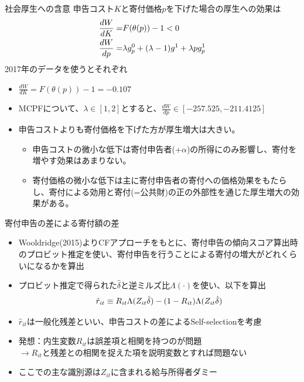 \documentclass[dvipdfmx,10pt]{beamer}
\begin{document}
\begin{frame}{社会厚生への含意}
	申告コスト$K$と寄付価格$p$を下げた場合の厚生への効果は
	\begin{align}
		\frac{dW}{dK}=&F(\theta(p))-1<0\notag\\
		\frac{dW}{dp}=&\lambda g_p^0+(\lambda-1)g^1+\lambda pg_p^1\notag
	\end{align}2017年のデータを使うとそれぞれ
	\begin{itemize}
		\item $\frac{dW}{dK}=F(\theta(p))-1=-0.107$
		\item MCPFについて、$\lambda\in[1,2]$とすると、$\frac{dW}{dp}\in[-257.525, -211.4125]$
		\item 申告コストよりも寄付価格を下げた方が厚生増大は大きい。
		\begin{itemize}
			\item 申告コストの微小な低下は寄付申告者(+$\alpha$)の所得にのみ影響し、寄付を増やす効果はあまりない。
			\item 寄付価格の微小な低下は主に寄付申告者の寄付への価格効果をもたらし、寄付による効用と寄付(=公共財)の正の外部性を通じた厚生増大の効果がある。
		\end{itemize}
	\end{itemize}
\end{frame}


\begin{frame}{寄付申告の差による寄付額の差}
	\begin{itemize}
		\item Wooldridge(2015)よりCFアプローチをもとに、寄付申告の傾向スコア算出時のプロビット推定を使い、寄付申告を行うことによる寄付の増大がどれくらいになるかを算出
		\item プロビット推定で得られた$\hat{\delta}$と逆ミルズ比$\Lambda(\cdot)$を使い、以下を算出
		\begin{align}
			\hat{r}_{it}\equiv R_{it}\Lambda(Z_{it}\hat{\delta})-(1-R_{it})\Lambda(Z_{it}\hat{\delta})\notag
		\end{align}
		\item $\hat{r}_{it}$は一般化残差といい、申告コストの差によるSelf-selectionを考慮
		\item 発想：内生変数$R_{it}$は誤差項と相関を持つのが問題\\
		\qquad$\to$$R_{it}$と残差との相関を捉えた項を説明変数とすれば問題ない
		\item ここでの主な識別源は$Z_{it}$に含まれる給与所得者ダミー
	\end{itemize}
\end{frame}
\end{document}
